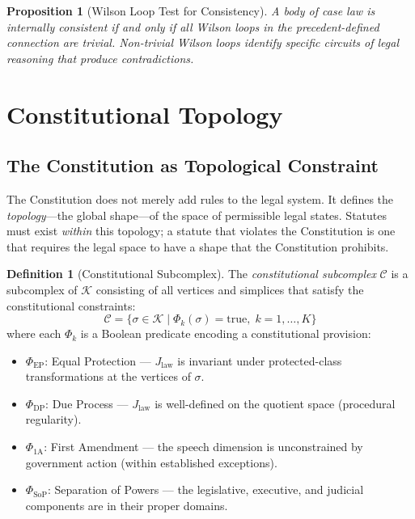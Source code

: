 \documentclass[12pt]{article}
\newtheorem{proposition}[theorem]{Proposition}
\theoremstyle{definition}
\newtheorem{definition}[theorem]{Definition}
\theoremstyle{remark}
\newcommand{\C}{\mathcal{C}}               %
\begin{document}
\begin{proposition}[Wilson Loop Test for Consistency]
\label{prop:wilson}
A body of case law is internally consistent if and only if all Wilson loops in the precedent-defined connection are trivial.  Non-trivial Wilson loops identify specific circuits of legal reasoning that produce contradictions.
\end{proposition}


\section{Constitutional Topology}
\label{sec:topology}

\subsection{The Constitution as Topological Constraint}

The Constitution does not merely add rules to the legal system.  It defines the \emph{topology}---the global shape---of the space of permissible legal states.  Statutes must exist \emph{within} this topology; a statute that violates the Constitution is one that requires the legal space to have a shape that the Constitution prohibits.

\begin{definition}[Constitutional Subcomplex]
\label{def:const_manifold}
The \emph{constitutional subcomplex} $\C$ is a subcomplex of $\mathcal{K}$ consisting of all vertices and simplices that satisfy the constitutional constraints:
\begin{equation}
\C = \{ \sigma \in \mathcal{K} \mid \Phi_k(\sigma) = \text{true},\; k = 1, \ldots, K \}
\label{eq:const_manifold}
\end{equation}
where each $\Phi_k$ is a Boolean predicate encoding a constitutional provision:
\begin{itemize}
    \item $\Phi_{\text{EP}}$: Equal Protection --- $J_{\text{law}}$ is invariant under protected-class transformations at the vertices of $\sigma$.
    \item $\Phi_{\text{DP}}$: Due Process --- $J_{\text{law}}$ is well-defined on the quotient space (procedural regularity).
    \item $\Phi_{\text{1A}}$: First Amendment --- the speech dimension is unconstrained by government action (within established exceptions).
    \item $\Phi_{\text{SoP}}$: Separation of Powers --- the legislative, executive, and judicial components are in their proper domains.
\end{itemize}
\end{definition}
\end{document}
